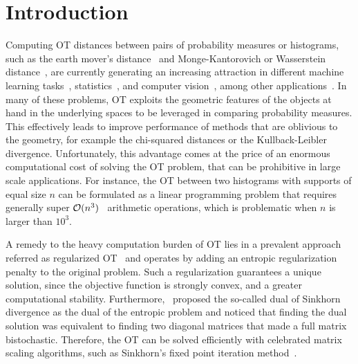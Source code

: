 
\section{Introduction} %
\label{sec:introduction}

Computing OT distances between pairs of probability measures or histograms, such as the earth mover's distance~\cite{werman1985,Rubner2000} and Monge-Kantorovich or Wasserstein distance~\citep{villani09optimal}, are currently generating an increasing attraction in different machine learning tasks~\cite{pmlr-v32-solomon14,kusnerb2015,pmlr-v70-arjovsky17a,ho2017}, statistics~\cite{frogner2015nips,panaretos2016,ebert2017ConstructionON,bigot2017,flamary2018WDA}, and computer vision~\cite{bonnel2011,Rubner2000,solomon2015}, among other applications~\cite{klouri17,peyre2019COTnowpublisher}.
In many of these problems, OT exploits the geometric features of the objects at hand in the underlying spaces to be leveraged in comparing probability measures.
This effectively leads to improve performance of methods that are oblivious to the geometry, for example the chi-squared distances or the Kullback-Leibler divergence.
Unfortunately, this advantage comes at the price of an enormous computational cost of solving the OT problem, that can be prohibitive in large scale applications.
For instance, the OT between two histograms with supports of equal size $n$ can be formulated as a linear programming problem that requires generally super $\mathcal{O}(n^3)$~\cite{pele2009} arithmetic operations, which is problematic when $n$ is larger than $10^3.$

A remedy to the heavy computation burden of OT lies in a prevalent approach referred as regularized OT~\cite{cuturinips13} and operates by adding an entropic regularization penalty to the original problem.  
Such a regularization guarantees a unique solution, since the objective function is strongly convex, and a greater computational stability.
Furthermore,~\cite{cuturinips13} proposed the so-called {dual of Sinkhorn divergence} as the dual of the entropic problem and noticed that finding the dual solution was equivalent to finding two diagonal matrices that made a full matrix bistochastic.
Therefore, the OT can be solved efficiently with celebrated matrix scaling algorithms, such as Sinkhorn's fixed point iteration method~\cite{sinkhorn1967,knight2008,kalantari2008}. 


